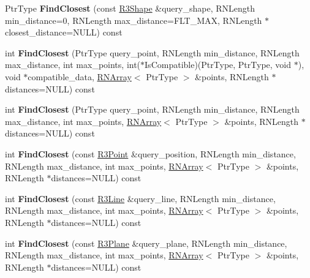 \begin{DoxyCompactItemize}
\item 
Ptr\+Type {\bfseries Find\+Closest} (const \hyperlink{class_r3_shape}{R3\+Shape} \&query\+\_\+shape, R\+N\+Length min\+\_\+distance=0, R\+N\+Length max\+\_\+distance=F\+L\+T\+\_\+\+M\+AX, R\+N\+Length $\ast$closest\+\_\+distance=N\+U\+LL) const \hypertarget{class_r3_kdtree_a856e61de11b59aaa6f9e1cd2a406891b}{}\label{class_r3_kdtree_a856e61de11b59aaa6f9e1cd2a406891b}

\item 
int {\bfseries Find\+Closest} (Ptr\+Type query\+\_\+point, R\+N\+Length min\+\_\+distance, R\+N\+Length max\+\_\+distance, int max\+\_\+points, int($\ast$Is\+Compatible)(Ptr\+Type, Ptr\+Type, void $\ast$), void $\ast$compatible\+\_\+data, \hyperlink{class_r_n_array}{R\+N\+Array}$<$ Ptr\+Type $>$ \&points, R\+N\+Length $\ast$distances=N\+U\+LL) const \hypertarget{class_r3_kdtree_a85e75d93d3ce0aef22d7e287dc7c475f}{}\label{class_r3_kdtree_a85e75d93d3ce0aef22d7e287dc7c475f}

\item 
int {\bfseries Find\+Closest} (Ptr\+Type query\+\_\+point, R\+N\+Length min\+\_\+distance, R\+N\+Length max\+\_\+distance, int max\+\_\+points, \hyperlink{class_r_n_array}{R\+N\+Array}$<$ Ptr\+Type $>$ \&points, R\+N\+Length $\ast$distances=N\+U\+LL) const \hypertarget{class_r3_kdtree_a2a2af4fb3c237612e742390cd20f1d19}{}\label{class_r3_kdtree_a2a2af4fb3c237612e742390cd20f1d19}

\item 
int {\bfseries Find\+Closest} (const \hyperlink{class_r3_point}{R3\+Point} \&query\+\_\+position, R\+N\+Length min\+\_\+distance, R\+N\+Length max\+\_\+distance, int max\+\_\+points, \hyperlink{class_r_n_array}{R\+N\+Array}$<$ Ptr\+Type $>$ \&points, R\+N\+Length $\ast$distances=N\+U\+LL) const \hypertarget{class_r3_kdtree_a18fa705bed88b8ecccd41586ab8ecca7}{}\label{class_r3_kdtree_a18fa705bed88b8ecccd41586ab8ecca7}

\item 
int {\bfseries Find\+Closest} (const \hyperlink{class_r3_line}{R3\+Line} \&query\+\_\+line, R\+N\+Length min\+\_\+distance, R\+N\+Length max\+\_\+distance, int max\+\_\+points, \hyperlink{class_r_n_array}{R\+N\+Array}$<$ Ptr\+Type $>$ \&points, R\+N\+Length $\ast$distances=N\+U\+LL) const \hypertarget{class_r3_kdtree_acdee93471b8f30c8d7c82c52152321c0}{}\label{class_r3_kdtree_acdee93471b8f30c8d7c82c52152321c0}

\item 
int {\bfseries Find\+Closest} (const \hyperlink{class_r3_plane}{R3\+Plane} \&query\+\_\+plane, R\+N\+Length min\+\_\+distance, R\+N\+Length max\+\_\+distance, int max\+\_\+points, \hyperlink{class_r_n_array}{R\+N\+Array}$<$ Ptr\+Type $>$ \&points, R\+N\+Length $\ast$distances=N\+U\+LL) const \hypertarget{class_r3_kdtree_acdb004f0eee2c6cc817ba984ae37a28b}{}\label{class_r3_kdtree_acdb004f0eee2c6cc817ba984ae37a28b}


\end{DoxyCompactItemize}
